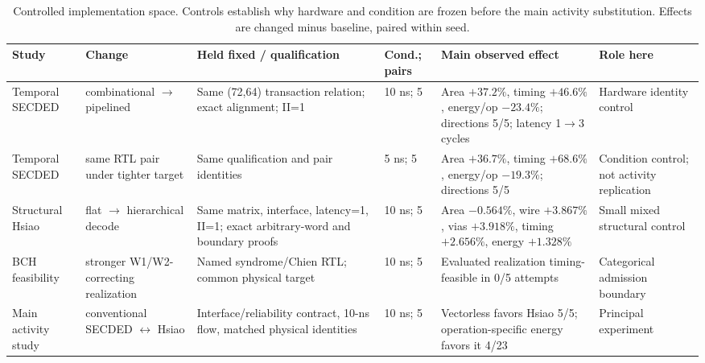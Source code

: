 \begin{table}[t]
\caption{Controlled implementation space. Controls establish why hardware and condition are frozen before the main activity substitution. Effects are changed minus baseline, paired within seed.}
\label{tab:implementation-controls}
\centering\scriptsize\setlength{\tabcolsep}{2.7pt}
\begin{tabular}{@{}p{1.55cm}p{2.05cm}p{2.55cm}p{1.3cm}p{4.65cm}p{2.05cm}@{}}
\toprule
Study & Change & Held fixed / qualification & Cond.; pairs & Main observed effect & Role here \\
\midrule
Temporal SECDED & combinational $\rightarrow$ pipelined & Same (72,64) transaction relation; exact alignment; II=1 & 10 ns; 5 & Area $+37.2\%$, timing $+46.6\%$, energy/op $-23.4\%$; directions 5/5; latency 1$\rightarrow$3 cycles & Hardware identity control \\
Temporal SECDED & same RTL pair under tighter target & Same qualification and pair identities & 5 ns; 5 & Area $+36.7\%$, timing $+68.6\%$, energy/op $-19.3\%$; directions 5/5 & Condition control; not activity replication \\
Structural Hsiao & flat $\rightarrow$ hierarchical decode & Same matrix, interface, latency=1, II=1; exact arbitrary-word and boundary proofs & 10 ns; 5 & Area $-0.564\%$, wire $+3.867\%$, vias $+3.918\%$, timing $+2.656\%$, energy $+1.328\%$ & Small mixed structural control \\
BCH feasibility & stronger W1/W2-correcting realization & Named syndrome/Chien RTL; common physical target & 10 ns; 5 & Evaluated realization timing-feasible in 0/5 attempts & Categorical admission boundary \\
Main activity study & conventional SECDED $\leftrightarrow$ Hsiao & Interface/reliability contract, 10-ns flow, matched physical identities & 10 ns; 5 & Vectorless favors Hsiao 5/5; operation-specific energy favors it 4/23 & Principal experiment \\
\bottomrule
\end{tabular}
\end{table}
